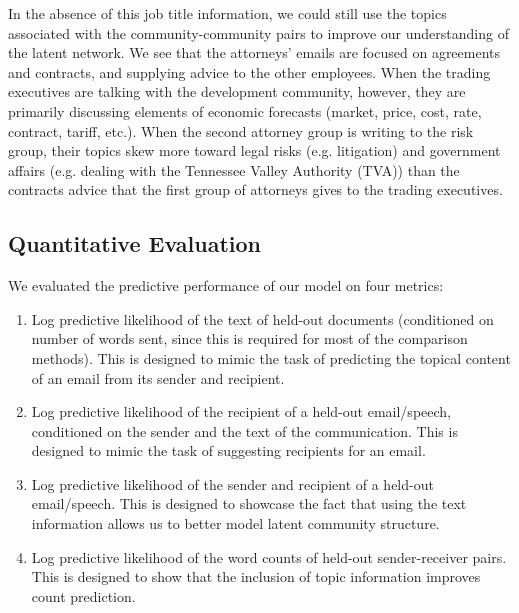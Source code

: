         In the absence of this job title information, we could still use the topics associated with the community-community pairs to improve our understanding of the latent network. We see that  the attorneys' emails are focused on agreements and contracts, and supplying advice to the other employees. When the trading executives are talking with the development community, however, they are primarily discussing elements of economic forecasts (market, price, cost, rate, contract, tariff, etc.).  When the second attorney group is writing to the risk group, their topics skew more toward legal risks (e.g. litigation) and government affairs (e.g. dealing with the Tennessee Valley Authority (TVA)) than the contracts advice that the first group of attorneys gives to the trading executives.
    
    \subsection{Quantitative Evaluation}\label{sec:quant}
        We evaluated the predictive performance of our model on four metrics:
        \begin{enumerate}
            \item Log predictive likelihood of the text of held-out documents (conditioned on number of words sent, since this is required for most of the comparison methods). This is designed to mimic the task of predicting the topical content of an email from its sender and recipient.
            \item Log predictive likelihood of the recipient of a held-out email/speech, conditioned on the sender and the text of the communication. This is designed to mimic the task of suggesting recipients for an email.
            \item Log predictive likelihood of the sender and recipient of a held-out email/speech. This is designed to showcase the fact that using the text information allows us to better model latent community structure. 
            \item Log predictive likelihood of the word counts of held-out sender-receiver pairs. This is designed to show that the inclusion of topic information improves count prediction.
        \end{enumerate}
        
